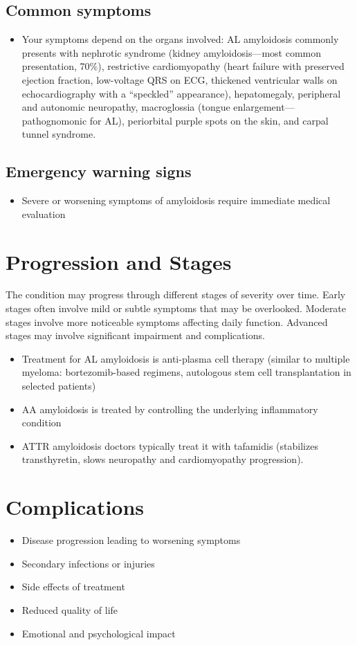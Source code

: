 \subsection{Common symptoms}
\begin{itemize}[noitemsep]
  \item Your symptoms depend on the organs involved: AL amyloidosis commonly presents with nephrotic syndrome (kidney amyloidosis---most common presentation, 70\%), restrictive cardiomyopathy (heart failure with preserved ejection fraction, low-voltage QRS on ECG, thickened ventricular walls on echocardiography with a ``speckled'' appearance), hepatomegaly, peripheral and autonomic neuropathy, macroglossia (tongue enlargement---pathognomonic for AL), periorbital purple spots on the skin, and carpal tunnel syndrome. 
  \end{itemize}

\subsection{Emergency warning signs}
\begin{itemize}[noitemsep]
  \item Severe or worsening symptoms of amyloidosis require immediate medical evaluation
\end{itemize}
\section{Progression and Stages}
The condition may progress through different stages of severity over time. Early stages often involve mild or subtle symptoms that may be overlooked. Moderate stages involve more noticeable symptoms affecting daily function. Advanced stages may involve significant impairment and complications.

\begin{itemize}[noitemsep]
  \item Treatment for AL amyloidosis is anti-plasma cell therapy (similar to multiple myeloma: bortezomib-based regimens, autologous stem cell transplantation in selected patients)
  \item AA amyloidosis is treated by controlling the underlying inflammatory condition
  \item ATTR amyloidosis doctors typically treat it with tafamidis (stabilizes transthyretin, slows neuropathy and cardiomyopathy progression).
\end{itemize}
\section{Complications}
\begin{itemize}[noitemsep]
  \item Disease progression leading to worsening symptoms
  \item Secondary infections or injuries
  \item Side effects of treatment
  \item Reduced quality of life
  \item Emotional and psychological impact
\end{itemize}
